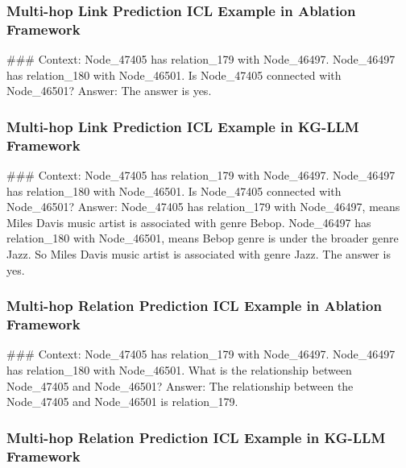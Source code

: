 \documentclass[pmlr]{jmlr}%
\begin{document}
\subsubsection{Multi-hop Link Prediction ICL Example in Ablation Framework}

\#\#\# Context:\newline
Node\_47405 has relation\_179 with Node\_46497. Node\_46497 has relation\_180 with Node\_46501. Is Node\_47405 connected with Node\_46501?\newline
Answer:\newline
The answer is yes.

\subsubsection{Multi-hop Link Prediction ICL Example in KG-LLM Framework}

\#\#\# Context:\newline
Node\_47405 has relation\_179 with Node\_46497. Node\_46497 has relation\_180 with Node\_46501. Is Node\_47405 connected with Node\_46501?\newline
Answer:\newline
Node\_47405 has relation\_179 with Node\_46497, means Miles Davis music artist is associated with genre Bebop. Node\_46497 has relation\_180 with Node\_46501, means Bebop genre is under the broader genre Jazz. So Miles Davis music artist is associated with genre Jazz.\newline
The answer is yes.

\subsubsection{Multi-hop Relation Prediction ICL Example in Ablation Framework}

\#\#\# Context:\newline
Node\_47405 has relation\_179 with Node\_46497. Node\_46497 has relation\_180 with Node\_46501. What is the relationship between Node\_47405 and Node\_46501?\newline
Answer:\newline
The relationship between the Node\_47405 and Node\_46501 is relation\_179.

\subsubsection{Multi-hop Relation Prediction ICL Example in KG-LLM Framework}
\end{document}
